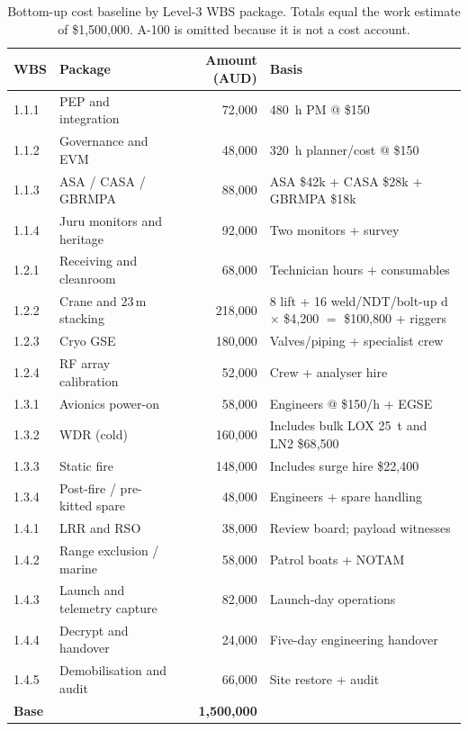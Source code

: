\begin{table}[H]
\centering
\footnotesize
\setlength{\tabcolsep}{4.2pt}
\caption[Bottom-up cost baseline by WBS]{Bottom-up cost baseline by Level-3 WBS package. Totals equal the work estimate of \$1{,}500{,}000. A-100 is omitted because it is not a cost account.}
\label{tab:wbs-cost}
\begin{tabularx}{\textwidth}{@{}l p{4.15cm} r X@{}}
\toprule
WBS & Package & Amount (AUD) & Basis \\
\midrule
1.1.1 & PEP and integration & 72{,}000 & 480~h PM @ \$150 \\
1.1.2 & Governance and EVM & 48{,}000 & 320~h planner/cost @ \$150 \\
1.1.3 & ASA / CASA / GBRMPA & 88{,}000 & ASA \$42k $+$ CASA \$28k $+$ GBRMPA \$18k \\
1.1.4 & Juru monitors and heritage & 92{,}000 & Two monitors + survey \\
1.2.1 & Receiving and cleanroom & 68{,}000 & Technician hours + consumables \\
1.2.2 & Crane and 23\,m stacking & 218{,}000 & 8 lift + 16 weld/NDT/bolt-up d $\times$ \$4{,}200 $=$ \$100{,}800 + riggers \\
1.2.3 & Cryo GSE & 180{,}000 & Valves/piping + specialist crew \\
1.2.4 & RF array calibration & 52{,}000 & Crew + analyser hire \\
1.3.1 & Avionics power-on & 58{,}000 & Engineers @ \$150/h + EGSE \\
1.3.2 & WDR (cold) & 160{,}000 & Includes bulk LOX 25~t and LN2 \$68{,}500 \\
1.3.3 & Static fire & 148{,}000 & Includes surge hire \$22{,}400 \\
1.3.4 & Post-fire / pre-kitted spare & 48{,}000 & Engineers + spare handling \\
1.4.1 & LRR and RSO & 38{,}000 & Review board; payload witnesses \\
1.4.2 & Range exclusion / marine & 58{,}000 & Patrol boats + NOTAM \\
1.4.3 & Launch and telemetry capture & 82{,}000 & Launch-day operations \\
1.4.4 & Decrypt and handover & 24{,}000 & Five-day engineering handover \\
1.4.5 & Demobilisation and audit & 66{,}000 & Site restore + audit \\
\midrule
\textbf{Base} & & \textbf{1{,}500{,}000} & \mbox{} \\
\bottomrule
\end{tabularx}


\end{table}
